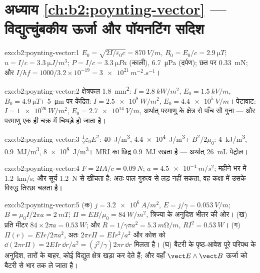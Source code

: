 \section*{अध्याय \ref{ch:b2:poynting-vector} --- विद्युत्चुंबकीय ऊर्जा और पॉयनटिंग सदिश}

\begin{solution}{exo:b2:poynting-vector:1}
$E_0 = \sqrt{2I/\varepsilon_0c} = \qty{870}{V/m}$, $B_0 = E_0/c = \qty{2.9}{\micro T}$; $u = I/c
= \qty{3.3}{\micro J/m^3}$; $P = I/c = \qty{3.3}{\micro Pa}$ (काली), \qty{6.7}{\micro Pa}
(दर्पण); छत पर \qty{0.33}{mN}; और $I/hf = 1000/3.2 \times 10^{-19} = \qty{3e21}{m^{-2}.s^{-1}}$।
\end{solution}

\begin{solution}{exo:b2:poynting-vector:2}
क्षेत्रफल \qty{1.8}{mm^2}: $I = \qty{2.8}{kW/m^2}$, $E_0 = \qty{1.5}{kV/m}$, $B_0 = \qty{4.9}{\micro T}$।
\qty{5}{\micro m} पर केंद्रित: $I = \qty{2.5e8}{W/m^2}$, $E_0 = \qty{4.4e5}{V/m}$। पेटावाट:
$I = \qty{1e26}{W/m^2}$, $E_0 = \qty{2.7e14}{V/m}$, अर्थात् परमाणु के क्षेत्र से पाँच सौ
गुना --- और परमाणु एक ही चक्र में चिथड़े हो जाता है।
\end{solution}

\begin{solution}{exo:b2:poynting-vector:3}
$\tfrac12\varepsilon_0E^2$: \qty{40}{J/m^3}, \qty{4.4e4}{J/m^3}। $B^2/2\mu_0$: \qty{4}{kJ/m^3},
\qty{0.9}{MJ/m^3}, \qty{8e8}{J/m^3}। MRI का छिद्र \qty{0.9}{MJ} रखता है --- अर्थात् \qty{26}{mL}
पेट्रोल।
\end{solution}

\begin{solution}{exo:b2:poynting-vector:4}
$F = 2IA/c = \qty{0.09}{N}$; $a = \qty{4.5e-4}{m/s^2}$; महीने भर में \qty{1.2}{km/s};
और सूर्य \qty{1.2}{N} से खींचता है: अतः पाल गुरुत्व से लड़ नहीं सकता, वह कक्षा में
उसके विरुद्ध तिरछा चलता है।
\end{solution}

\begin{solution}{exo:b2:poynting-vector:5}
(क) $j = \qty{3.2e6}{A/m^2}$, $E = j/\gamma = \qty{0.053}{V/m}$; $B = \mu_0I/2\pi a = \qty{2}{mT}$;
$\Pi = EB/\mu_0 = \qty{84}{W/m^2}$, त्रिज्या के अनुदिश भीतर की ओर। (ख) प्रति मीटर $84 \times 2\pi a = \qty{0.53}{W}$;
और $R = 1/\gamma\pi a^2 = \qty{5.3}{m\ohm/m}$, $RI^2 = \qty{0.53}{W}$। (ग) $\Pi(r)
= EIr/2\pi a^2$, अतः $2\pi r\Pi = EIr^2/a^2$ और कोश को $\dd(2\pi r\Pi)
= 2EIr\,\dd r/a^2 = (j^2/\gamma)2\pi r\,\dd r$ मिलता है। (घ) बैटरी के पृष्ठ-आवेश
पूरे परिपथ के अनुदिश, तारों के बाहर, कोई विद्युत क्षेत्र खड़ा कर देते हैं;
और वहाँ $\vect E\wedge\vect B$ ऊर्जा को बैटरी से भार तक ले जाता है।
\end{solution}

